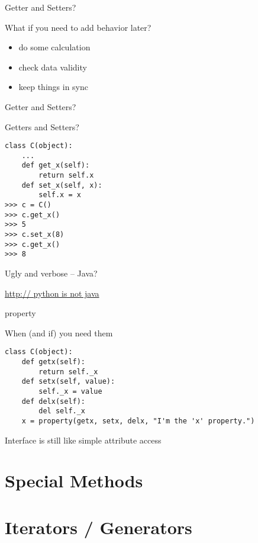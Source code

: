 \documentclass{beamer}
\begin{document}
\begin{frame}[fragile]{Getter and Setters?}

{\Large What if you need to add behavior later?}

\begin{itemize}
  \item do some calculation
  \item check data validity
  \item keep things in sync
\end{itemize}

\end{frame}


\begin{frame}[fragile]{Getter and Setters?}

{\Large Getters and Setters?}

\begin{verbatim}
class C(object):
    ...
    def get_x(self):
        return self.x
    def set_x(self, x):
        self.x = x
>>> c = C()
>>> c.get_x()
>>> 5
>>> c.set_x(8)
>>> c.get_x()
>>> 8
\end{verbatim}
{\Large Ugly and verbose -- Java?}

\vfill
\url{http:// python is not java}
\end{frame} 

\begin{frame}[fragile]{property}

{\Large When (and if) you need them}

\begin{verbatim}
class C(object):
    def getx(self):
        return self._x
    def setx(self, value):
        self._x = value
    def delx(self):
        del self._x
    x = property(getx, setx, delx, "I'm the 'x' property.")
\end{verbatim}
{\Large Interface is still like simple attribute access}

\end{frame} 


\section{Special Methods}




\section{Iterators / Generators}
\end{document}
